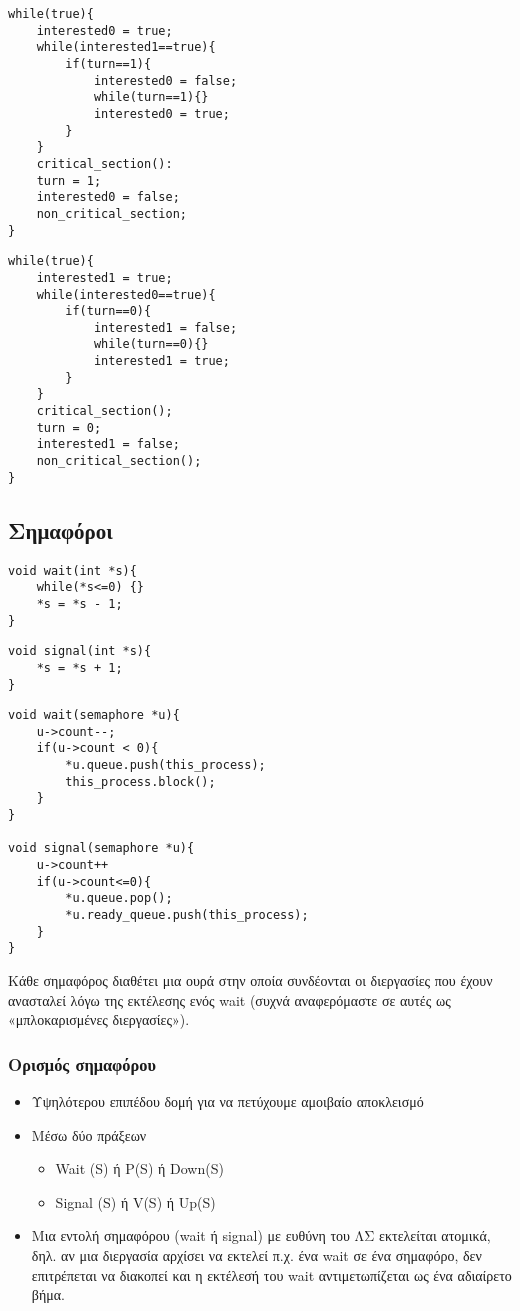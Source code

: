 \begin{lstlisting}[caption=Process P0]
while(true){
	interested0 = true;
	while(interested1==true){
		if(turn==1){
			interested0 = false;
			while(turn==1){}
			interested0 = true;
		}
	}
	critical_section():
	turn = 1;
	interested0 = false;
	non_critical_section;
}
\end{lstlisting}

\begin{lstlisting}[caption=Process P1]
while(true){
	interested1 = true;
	while(interested0==true){
		if(turn==0){
			interested1 = false;
			while(turn==0){}
			interested1 = true;
		}
	}
	critical_section();
	turn = 0;
	interested1 = false;
	non_critical_section();
}
\end{lstlisting}

\subsection{Σημαφόροι}

\begin{lstlisting}[caption=wait or P or down function implementaion]
void wait(int *s){
	while(*s<=0) {}
	*s = *s - 1;
}
\end{lstlisting}

\begin{lstlisting}[caption=signal or V or up function implementaiton]
void signal(int *s){
	*s = *s + 1;
}
\end{lstlisting}

\begin{lstlisting}[caption=General semaphore implementation]
void wait(semaphore *u){
	u->count--;
	if(u->count < 0){
		*u.queue.push(this_process);
		this_process.block();
	}
}

void signal(semaphore *u){
	u->count++
	if(u->count<=0){
		*u.queue.pop();
		*u.ready_queue.push(this_process);
	}
}
\end{lstlisting}

Κάθε σημαφόρος διαθέτει μια ουρά στην οποία συνδέονται οι διεργασίες που
έχουν ανασταλεί λόγω της εκτέλεσης ενός wait (συχνά αναφερόμαστε σε αυτές
ως «μπλοκαρισμένες διεργασίες»).

\subsubsection{Ορισμός σημαφόρου}

\begin{itemize}
	\item	Υψηλότερου επιπέδου δομή για να πετύχουμε αμοιβαίο αποκλεισμό
	\item	Μέσω δύο πράξεων
		\begin{itemize}
			\item	Wait (S) ή P(S) ή Down(S)
			\item	Signal (S) ή V(S) ή Up(S)
		\end{itemize}
	\item	Μια εντολή σημαφόρου (wait ή signal) με ευθύνη
		του ΛΣ εκτελείται ατομικά, δηλ. αν μια διεργασία
		αρχίσει να εκτελεί π.χ. ένα wait σε ένα σημαφόρο,
		δεν επιτρέπεται να διακοπεί και η εκτέλεσή του
		wait αντιμετωπίζεται ως ένα αδιαίρετο βήμα.
\end{itemize}

